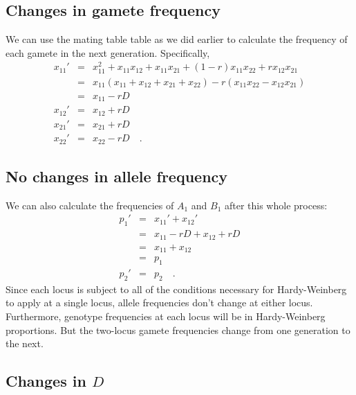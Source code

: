 \subsection*{Changes in gamete frequency}

We can use the mating table table as we did earlier to calculate the
frequency of each gamete in the next generation. Specifically,
\begin{eqnarray*}
x_{11}' &=& x_{11}^2 + x_{11}x_{12} + x_{11}x_{21} + (1-r)x_{11}x_{22}
            + rx_{12}x_{21} \\
        &=& x_{11}(x_{11} + x_{12} + x_{21} + x_{22})
            - r(x_{11}x_{22} - x_{12}x_{21}) \\
        &=& x_{11} - rD \\
x_{12}' &=& x_{12} + rD \\
x_{21}' &=& x_{21} + rD \\
x_{22}' &=& x_{22} - rD \quad .
\end{eqnarray*}

\subsection*{No changes in allele frequency}

We can also calculate the frequencies of $A_1$ and $B_1$ after this
whole process:
\begin{eqnarray*}
p_1' &=& x_{11}' + x_{12}' \\
     &=& x_{11} - rD + x_{12} + rD \\
     &=& x_{11} + x_{12} \\
     &=& p_1 \\
p_2' &=& p_2 \quad .
\end{eqnarray*}
Since each locus is subject to all of the conditions necessary for
Hardy-Weinberg to apply at a single locus, allele frequencies don't
change at either locus. Furthermore, genotype frequencies at each
locus will be in Hardy-Weinberg proportions. But the two-locus gamete
frequencies change from one generation to the next.

\subsection*{Changes in $D$}

